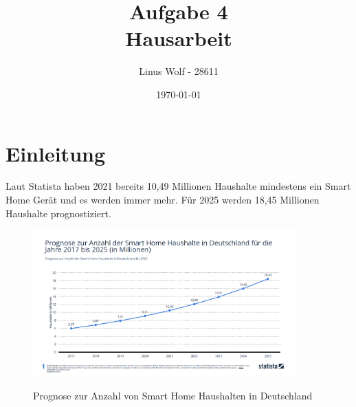 \documentclass[12pt, a4paper, onecolumn, oneside, toc=bibliographynumbered, liststotoc]{scrreprt} %
\begin{document}
	\titlehead{Hochschule Rhein-Waal \\ %
	Fakultät: Kommunikation und Umwelt\\
	Studiengang: Verwaltungsinformatik\\
	Modul: Workshop 2: Wissenschaftliches Schreiben\\}
	\title{Aufgabe 4\\
	Hausarbeit} %
	\author{Linus Wolf - 28611}
	\date{\today} %

\maketitle %
\newpage

\tableofcontents %
\newpage

\listoffigures %
\newpage %


	\chapter{Einleitung}
Laut Statista haben 2021 bereits 10,49 Millionen Haushalte mindestens ein Smart Home Gerät und es werden immer mehr. Für 2025 werden 18,45 Millionen Haushalte prognostiziert.

\begin{figure}[H]
	\centering
	\caption{Prognose zur Anzahl von Smart Home Haushalten in Deutschland} %
	\includegraphics[width=0.9\textwidth]{AnzahlSmartHomeHaushalteStatista}
	\label{AnzahlGeräte}
\end{figure}
\end{document}
